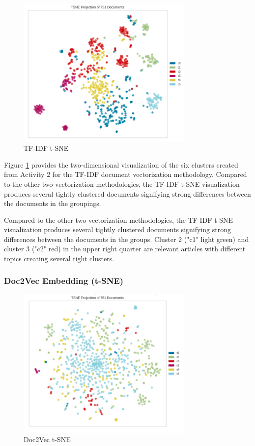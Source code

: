 \documentclass[5p,authoryear]{elsarticle}
\begin{document}
\begin{figure}[!htb] \centering
	\includegraphics[width=3.4in]{figures/tfidf_tsne.png}
	\caption[]{TF-IDF t-SNE} 
	\label{TF-IDF t-SNE} 
\end{figure}

Figure \ref{TF-IDF t-SNE} provides the two-dimensional visualization of the six clusters created from Activity 2 for the TF-IDF document vectorization methodology.
Compared to the other two vectorization methodologies, the TF-IDF t-SNE visualization produces several tightly clustered documents signifying strong differences between the documents in the groupings.

Compared to the other two vectorization methodologies, the TF-IDF t-SNE visualization produces several tightly clustered documents signifying strong differences between the documents in the groups.
Cluster 2 ("c1" light green) and cluster 3 ("c2" red) in the upper right quarter are relevant articles with different topics creating several tight clusters.



\subsubsection{Doc2Vec Embedding (t-SNE)}\label{doc3}

\begin{figure}[!htb] \centering
	\includegraphics[width=3.4in]{figures/Doc2vec_tsne.png}
	\caption[]{Doc2Vec t-SNE} 
	\label{DocTSNE} 
\end{figure}
\end{document}
